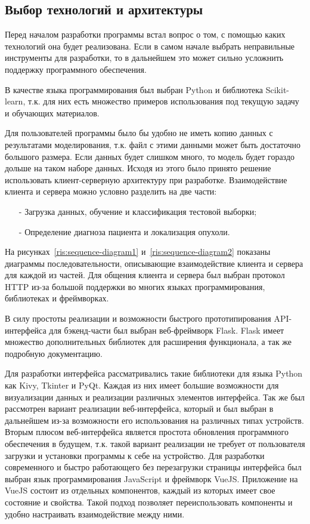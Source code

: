 \subsection{Выбор технологий и архитектуры}
Перед началом разработки программы встал вопрос о том, с помощью каких технологий она будет реализована. Если в самом начале выбрать неправильные инструменты для разработки, то в дальнейшем это может сильно усложнить поддержку программного обеспечения.
\par
В качестве языка программирования был выбран Python и библиотека Scikit-learn, т.к. для них есть множество примеров использования под текущую задачу и обучающих материалов.
\par
Для пользователей программы было бы удобно не иметь копию данных с результатами моделирования, т.к. файл с этими данными может быть достаточно большого размера. Если данных будет слишком много, то модель будет гораздо дольше на таком наборе данных. Исходя из этого было принято решение использовать клиент-серверную архитектуру при разработке. Взаимодействие клиента и сервера можно условно разделить на две части:
\begin{itemize}
	\item[-] Загрузка данных, обучение и классификация тестовой выборки;
	\item[-] Определение диагноза пациента и локализация опухоли.
\end{itemize}
\par
На рисунках~\ref{ris:sequence-diagram1} и~\ref{ris:sequence-diagram2} показаны диаграммы последовательности, описывающие взаимодействие клиента и сервера для каждой из частей. Для общения клиента и сервера был выбран протокол HTTP из-за большой поддержки во многих языках программирования, библиотеках и фреймворках.
\par
В силу простоты реализации и возможности быстрого прототипирования API-интерфейса для бэкенд-части был выбран веб-фреймворк Flask. Flask имеет множество дополнительных библиотек для расширения функционала, а так же подробную документацию.
\par
Для разработки интерфейса рассматривались такие библиотеки для языка Python как Kivy, Tkinter и PyQt. Каждая из них имеет большие возможности для визуализации данных и реализации различных элементов интерфейса. Так же был рассмотрен вариант реализации веб-интерфейса, который и был выбран в дальнейшем из-за возможности его использования на различных типах устройств. Вторым плюсом веб-интерфейса является простота обновления программного обеспечения в будущем, т.к. такой вариант реализации не требует от пользователя загрузки и установки программы к себе на устройство. Для разработки современного и быстро работающего без перезагрузки страницы интерфейса был выбран язык программирования JavaScript и фреймворк VueJS. Приложение на VueJS состоит из отдельных компонентов, каждый из которых имеет свое состояние и свойства. Такой подход позволяет переиспользовать компоненты и удобно настраивать взаимодействие между ними.


